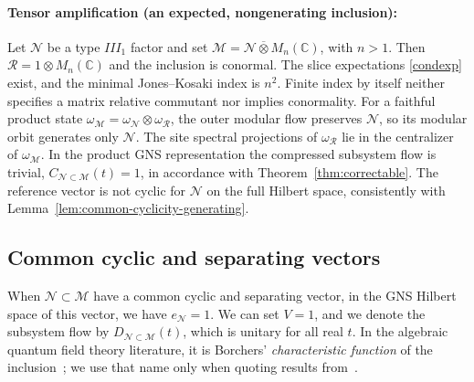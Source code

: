 \documentclass[a4paper,11pt]{article}
\theoremstyle{definition}
\newcommand{\mR}{\mathcal{R}}
\newcommand{\mN}{\mathcal{N}}
\newcommand{\mM}{\mathcal{M}}
\begin{document}
\paragraph{Tensor amplification (an expected, nongenerating inclusion):}
Let $\mN$ be a type $III_1$ factor and set $\mM=\mN\overline\otimes M_n(\mathbb C)$,
with $n>1$. Then $\mR=1\otimes M_n(\mathbb C)$ and the inclusion is conormal.
The slice expectations \eqref{condexp} exist, and the minimal Jones--Kosaki index
is $n^2$. Finite index by itself neither specifies a matrix relative commutant
nor implies conormality.
For a faithful product state $\omega_{\mM}=\omega_{\mN}\otimes\omega_{\mR}$, the outer modular
flow preserves $\mN$, so its modular orbit generates only $\mN$.
The site spectral projections of $\omega_{\mR}$ lie in the centralizer of $\omega_{\mM}$.
In the product GNS representation the compressed subsystem flow is trivial, $C_{\mN\subset\mM}(t)=1$, in accordance with Theorem~\ref{thm:correctable}. The reference vector is not cyclic for $\mN$ on the full Hilbert
space, consistently with Lemma~\ref{lem:common-cyclicity-generating}.





\subsection{Common cyclic and separating vectors}\label{subsec:common-cyclic}

When $\mN\subset \mM$ have a common cyclic and separating vector, in the GNS Hilbert space of this vector, we have $e_{\mN}=1$. We can set $V=1$, and we denote the subsystem flow by $D_{\mN\subset\mM}(t)$, which is unitary for all real $t$.  In the algebraic quantum field theory literature, it is Borchers' \emph{characteristic function} of the inclusion~\cite{revolutionizing}; we use that name only when quoting results from~\cite{revolutionizing}.
\end{document}
